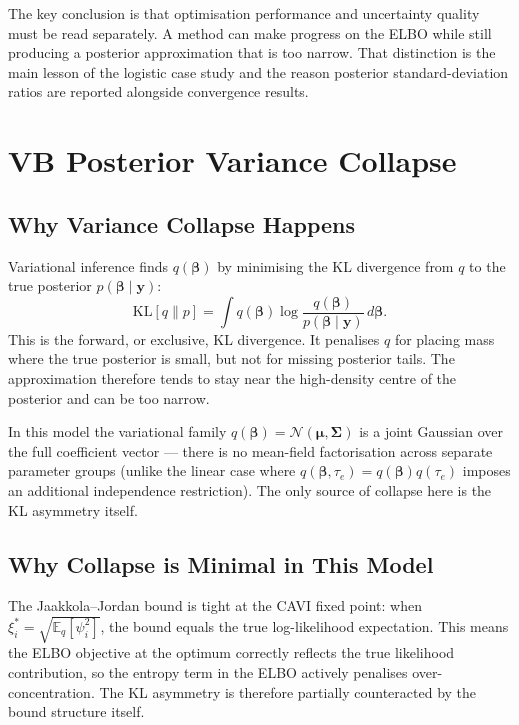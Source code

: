 \documentclass[11pt,a4paper]{article}
\newcommand{\E}{\mathbb{E}}
\newcommand{\N}{\mathcal{N}}
\begin{document}
The key conclusion is that optimisation performance and uncertainty quality must
be read separately. A method can make progress on the ELBO while still producing
a posterior approximation that is too narrow. That distinction is the main lesson
of the logistic case study and the reason posterior standard-deviation ratios are
reported alongside convergence results.

\nocite{*}
\printbibliography

\appendix
\renewcommand{\thesection}{Appendix~\Alph{section}}

\newpage
\section{VB Posterior Variance Collapse}
\label{app:vb-collapse}

\subsection*{Why Variance Collapse Happens}

Variational inference finds $q(\bm{\beta})$ by minimising the KL divergence from $q$
to the true posterior $p(\bm{\beta}\mid\bm{y})$:
\begin{equation}
  \mathrm{KL}[q \| p] = \int q(\bm{\beta}) \log \frac{q(\bm{\beta})}{p(\bm{\beta}\mid\bm{y})} \, d\bm{\beta}.
\end{equation}
This is the forward, or exclusive, KL divergence.
It penalises $q$ for placing mass where the true posterior is small, but not for
missing posterior tails.
The approximation therefore tends to stay near the high-density centre of the posterior
and can be too narrow.

In this model the variational family $q(\bm{\beta}) = \N(\bm{\mu}, \bm{\Sigma})$ is a
joint Gaussian over the full coefficient vector --- there is no mean-field factorisation
across separate parameter groups (unlike the linear case where $q(\bm{\beta},\tau_e) =
q(\bm{\beta})q(\tau_e)$ imposes an additional independence restriction).
The only source of collapse here is the KL asymmetry itself.

\subsection*{Why Collapse is Minimal in This Model}

The Jaakkola--Jordan bound is tight at the CAVI fixed point: when
$\xi_i^* = \sqrt{\E_q[\psi_i^2]}$, the bound equals the true log-likelihood expectation.
This means the ELBO objective at the optimum correctly reflects the true likelihood
contribution, so the entropy term in the ELBO actively penalises over-concentration.
The KL asymmetry is therefore partially counteracted by the bound structure itself.
\end{document}
